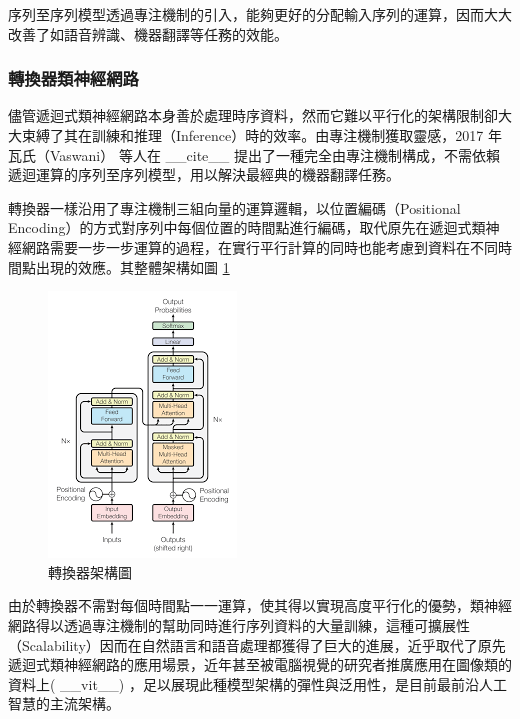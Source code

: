 序列至序列模型透過專注機制的引入，能夠更好的分配輸入序列的運算，因而大大改善了如語音辨識、機器翻譯等任務的效能。

\subsubsection{轉換器類神經網路}

儘管遞迴式類神經網路本身善於處理時序資料，然而它難以平行化的架構限制卻大大束縛了其在訓練和推理（Inference）時的效率。由專注機制獲取靈感，2017 年瓦氏（Vaswani） 等人在 \_\_cite\_\_ 提出了一種完全由專注機制構成，不需依賴遞迴運算的序列至序列模型，用以解決最經典的機器翻譯任務。

轉換器一樣沿用了專注機制三組向量的運算邏輯，以位置編碼（Positional Encoding）的方式對序列中每個位置的時間點進行編碼，取代原先在遞迴式類神經網路需要一步一步運算的過程，在實行平行計算的同時也能考慮到資料在不同時間點出現的效應。其整體架構如圖 \ref{fig:tfm}

\begin{figure}
    \centering
    \includegraphics[width=0.5\linewidth]{figures/transformer_ori.png}
    \caption{轉換器架構圖}
    \label{fig:tfm}
\end{figure}



由於轉換器不需對每個時間點一一運算，使其得以實現高度平行化的優勢，類神經網路得以透過專注機制的幫助同時進行序列資料的大量訓練，這種可擴展性（Scalability）因而在自然語言和語音處理都獲得了巨大的進展，近乎取代了原先遞迴式類神經網路的應用場景，近年甚至被電腦視覺的研究者推廣應用在圖像類的資料上( \_\_vit\_\_) ，足以展現此種模型架構的彈性與泛用性，是目前最前沿人工智慧的主流架構。

